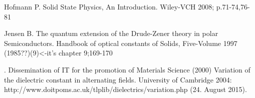 \begin{thebibliography}{9}

         Hofmann P.
         Solid State Physics, An Introduction.
         Wiley-VCH 2008; p.71-74,76-81

       Jensen B.
       The quantum extension of the Drude-Zener theory in polar Semiconductors.
       Handbook of optical constants of Solids, Five-Volume 1997 (1985??)(9)<-it's chapter 9;169-170

      .
         Dissemination of IT for the promotion of Materials Science (2000)
         Variation of the dielectric constant in alternating fields.
         University of Cambridge 2004:
         http://www.doitpoms.ac.uk/tlplib/dielectrics/variation.php
         (24. August 2015).
\end{thebibliography}
